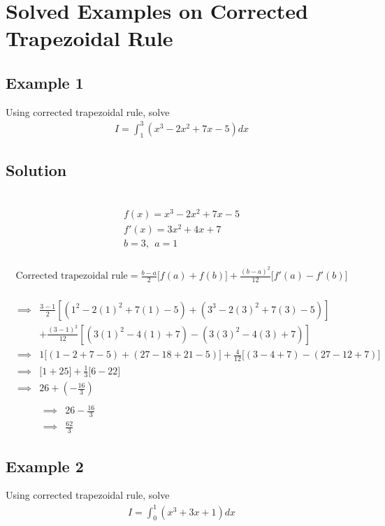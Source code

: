 \documentclass[12pt]{report}
\newcommand{\sps}{\\[0.2cm]}
\newcommand{\spn}[1]{\\[#1cm]}
\newcommand{\sprime}{'}
\begin{document}
	
	
	\section{Solved Examples on Corrected Trapezoidal Rule}
	\subsection{Example 1}
	Using corrected trapezoidal rule, solve
	\begin{eqnarray*}
		I = \int_1^3\left(x^3 - 2x^2 + 7x - 5\right)dx
	\end{eqnarray*}
	
	\subsection*{Solution}
	{~}\\[-2.1cm]
	\begin{gather*}
		f(x) = x^3 - 2x^2 + 7x - 5\sps
		f\sprime(x) = 3x^2 + 4x + 7\sps
		b=3,~~ a=1
	\end{gather*}
	{~}\\[-2.1cm]
	\begin{gather*}
		\text{Corrected trapezoidal rule} = \frac{b-a}{2}\Big[f(a) + f(b)\Big] + \frac{(b-a)^2}{12}\Big[f\sprime(a)-f\sprime(b)\Big]
	\end{gather*}
	{~}\\[-1.5cm]
	\begin{eqnarray*}
		&\implies&\frac{3-1}{2}\left[(1^2-2(1)^2 + 7(1) - 5) + (3^3 - 2(3)^2 + 7(3) - 5)\right]\sps
		&& +\frac{(3-1)^2}{12}\left[(3(1)^2 - 4(1) + 7) - (3(3)^2 - 4(3) + 7)\right]\spn{0.4}
		&\implies& 1\Big[(1-2+7-5) + (27-18+21-5)\Big] + \frac{4}{12}\Big[(3-4+7)- (27-12+7)\Big]\spn{0.4}
		&\implies&\Big[1+25\Big]+ \frac{1}{3}\Big[6-22\Big]\spn{0.4}
		&\implies& 26 + \left(-\frac{16}{3}\right)\spn{0.4}
	\end{eqnarray*}
	\begin{eqnarray*}
		&\implies& 26 - \frac{16}{3}\hspace{10cm}\spn{0.4}
		&\implies& \frac{62}{3}
	\end{eqnarray*}
	
	
		\subsection{Example 2}
	Using corrected trapezoidal rule, solve
	\begin{eqnarray*}
		I = \int_0^1\left(x^3 +3x + 1\right)dx
	\end{eqnarray*}
	
\end{document}
